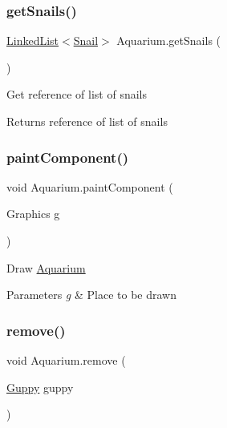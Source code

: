 \subsubsection{\texorpdfstring{get\+Snails()}{getSnails()}}
{\footnotesize\ttfamily \mbox{\hyperlink{class_linked_list}{Linked\+List}}$<$\mbox{\hyperlink{class_snail}{Snail}}$>$ Aquarium.\+get\+Snails (\begin{DoxyParamCaption}{ }\end{DoxyParamCaption})\hspace{0.3cm}{\ttfamily [inline]}}

Get reference of list of snails \begin{DoxyReturn}{Returns}
reference of list of snails 
\end{DoxyReturn}
\mbox{\label{class_aquarium_a1dddaa60d7c8ab3ef8addf1a1b1dfe4d}} 
\subsubsection{\texorpdfstring{paint\+Component()}{paintComponent()}}
{\footnotesize\ttfamily void Aquarium.\+paint\+Component (\begin{DoxyParamCaption}\item[{Graphics}]{g }\end{DoxyParamCaption})\hspace{0.3cm}{\ttfamily [inline]}}

Draw \mbox{\hyperlink{class_aquarium}{Aquarium}} 
\begin{DoxyParams}{Parameters}
{\em g} & Place to be drawn \\
\hline
\end{DoxyParams}
\mbox{\label{class_aquarium_a60bd4bc395dd03c5ab313ef49129c295}} 
\subsubsection{\texorpdfstring{remove()}{remove()}\hspace{0.1cm}{\footnotesize\ttfamily [1/5]}}
{\footnotesize\ttfamily void Aquarium.\+remove (\begin{DoxyParamCaption}\item[{\mbox{\hyperlink{class_guppy}{Guppy}}}]{guppy }\end{DoxyParamCaption})\hspace{0.3cm}{\ttfamily [inline]}}

